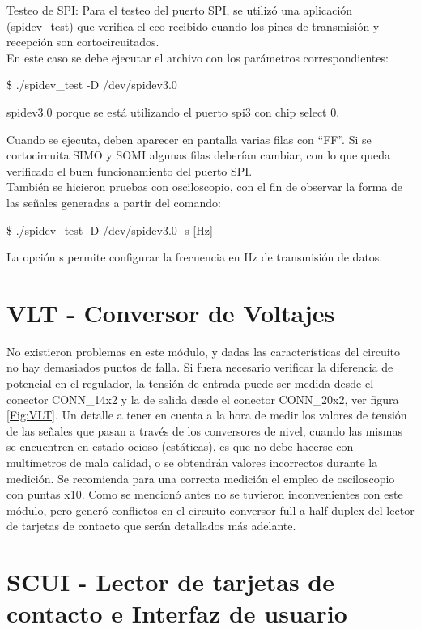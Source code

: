 \bigskip
Testeo de SPI: Para el testeo del puerto SPI, se utilizó una aplicación (spidev\_test) que verifica el eco recibido cuando los pines de transmisión y recepción son cortocircuitados.\\
En este caso se debe ejecutar el archivo con los parámetros correspondientes:

\bigskip
\centerline{\$ ./spidev\_test -D /dev/spidev3.0}

spidev3.0 porque se está utilizando el puerto spi3 con chip select 0.

\bigskip
Cuando se ejecuta, deben aparecer en pantalla varias filas con “FF”. Si
se cortocircuita SIMO y SOMI algunas filas deberían cambiar, con lo que queda
verificado el buen funcionamiento del puerto SPI. \\
También se hicieron pruebas con osciloscopio, con el fin de observar la forma de las señales generadas a partir del comando:

\bigskip
\centerline{\$ ./spidev\_test -D /dev/spidev3.0 -s [Hz]}

La opción s permite configurar la frecuencia en Hz de transmisión de datos.


\section{VLT - Conversor de Voltajes}
No existieron problemas en este módulo, y dadas las características del circuito
no hay demasiados puntos de falla. Si fuera necesario verificar la diferencia de
potencial en el regulador, la tensión de entrada puede ser medida desde
el conector CONN\_14x2 y la de salida desde el conector CONN\_20x2, ver figura \ref{Fig:VLT}.
Un detalle a tener en cuenta a la hora de medir los valores de tensión de las
señales que pasan a través de los conversores de nivel, cuando las mismas se 
encuentren en estado ocioso (estáticas), es que no debe hacerse con multímetros 
de mala calidad, o se obtendrán valores incorrectos durante la medición. Se 
recomienda para una correcta medición el empleo de osciloscopio con puntas x10. 
Como se mencionó antes no se tuvieron inconvenientes con este módulo, pero generó 
conflictos en el circuito conversor full a half duplex del lector de tarjetas de 
contacto que serán detallados más adelante.


\section{SCUI - Lector de tarjetas de contacto e Interfaz de usuario}

